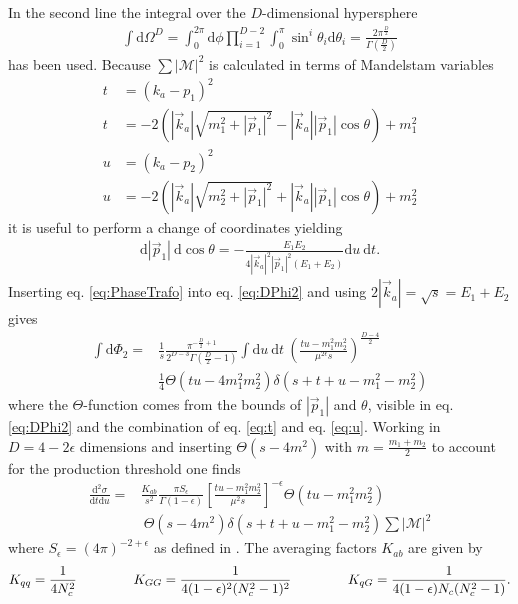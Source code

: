In the second line the integral over the $D$-dimensional hypersphere 
\begin{align}
\int \mathrm{d}\Omega^D = \int_0^{2\pi} \mathrm{d}\phi \prod_{i=1}^{D-2}\int_0^\pi \sin^i\theta_i \mathrm{d}\theta_i = \frac{2\pi^{\frac{D}{2}}}{\Gamma(\frac{D}{2})}
\end{align}
has been used. Because $\sum|\mathcal{M}|^2$ is calculated in terms of Mandelstam variables 
\begin{align}
t &= (k_a-p_1)^2  \nonumber\\
t &= -2\left(|\vec{k}_a| \sqrt{m_1^2 + |\vec{p}_1|^2} - |\vec{k}_a||\vec{p}_1| \cos\theta\right) + m_1^2\label{eq:t} \\
u &= (k_a-p_2)^2\nonumber\\
u &= -2\left(|\vec{k}_a| \sqrt{m_2^2 + |\vec{p}_1|^2} + |\vec{k}_a||\vec{p}_1| \cos\theta\right) + m_2^2\label{eq:u}
\end{align}
it is useful to perform a change of coordinates yielding
\begin{align}
\mathrm{d}|\vec{p}_1|\ \mathrm{d}\cos\theta = -\frac{E_1 E_2}{4|\vec{k}_a|^2|\vec{p}_1|^2(E_1+E_2)}\mathrm{d}u\ \mathrm{d}t.\label{eq:PhaseTrafo}
\end{align}
Inserting eq. \eqref{eq:PhaseTrafo} into eq. \eqref{eq:DPhi2} and using $2|\vec{k}_a| = \sqrt{s} = E_1 + E_2$ gives
\begin{align}
\int \mathrm{d}\Phi_2 = & \frac{1}{s} \frac{\pi^{-\frac{D}{2}+1}}{2^{D-3}\Gamma(\frac{D}{2}-1)} \int \mathrm{d}u\ \mathrm{d}t\ \left( \frac{tu-m_1^2m_2^2}{\mu^{2\epsilon} s} \right)^{\frac{D-4}{2}} \nonumber\\
&\frac{1}{4}\Theta(tu-4m_1^2m_2^2)\delta \left(s+t+u-m_1^2-m_2^2\right)
\end{align}
where the $\Theta$-function comes from the bounds of $|\vec{p}_1|$ and $\theta$, visible in eq. \eqref{eq:DPhi2} and the combination of eq. \eqref{eq:t} and eq. \eqref{eq:u}. Working in $D=4-2\epsilon$ dimensions and inserting $\Theta(s-4m^2)$ with $m = \frac{m_1 + m_2}{2}$ to account for the production threshold one finds
\begin{align}
\frac{\mbox{d}^2 \sigma}{\mbox{d}t\mbox{d}u} =& \frac{K_{ab}}{s^2} \frac{\pi S_{\epsilon}}{\Gamma(1-\epsilon)} \left[ \frac{tu-m_1^2m_2^2}{\mu^2 s}\right]^{-\epsilon} \Theta(tu-m_1^2m_2^2)\nonumber\\
&\ \Theta(s-4m^2) \delta(s+t+u-m_1^2-m_2^2) \sum |\mathcal{M}|^2
\end{align}
where $S_\epsilon = (4\pi)^{-2+\epsilon}$ as defined in \cite{Beenakker:1996ch}.
The averaging factors $K_{ab}$ are given by
\begin{align}
K_{qq} = \frac{1}{4N_c^2} \hspace{1.5cm}K_{GG} = \frac{1}{4(1-\epsilon)^2(N_c^2-1)^2} \hspace{1.5cm}K_{qG} = \frac{1}{4(1-\epsilon)N_c(N_c^2-1)}.
\end{align}

